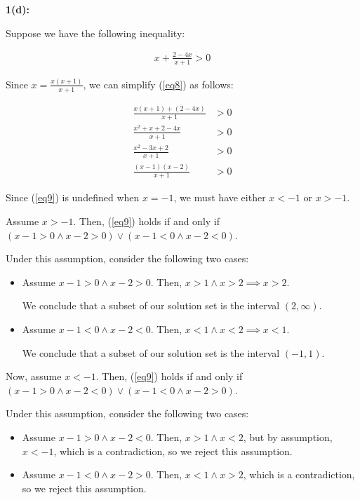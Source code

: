 \documentclass{article}
\begin{document}
\medskip
\textbf{1(d):}

Suppose we have the following inequality:

\begin{align} \label{eq8}
	x + \frac{2-4x}{x+1} > 0
\end{align}

Since $x = \frac{x(x+1)}{x+1}$,
we can simplify (\ref{eq8}) as follows:

\begin{align}
	\frac{x(x+1) + (2-4x)}{x+1} &> 0 \\
	\frac{x^2 + x + 2-4x}{x+1} &> 0 \\
	\frac{x^2 -3x + 2}{x+1} &> 0 \\
	\label{eq9}
	\frac{(x-1)(x-2)}{x+1} &> 0
\end{align}

Since (\ref{eq9}) is undefined when $x = -1$,
we must have either $x < -1$ or $x > -1$.

Assume $x > -1$.
Then, (\ref{eq9}) holds if and only if
$(x - 1 > 0 \land  x-2 > 0) \lor (x-1 < 0 \land x-2 < 0)$.

Under this assumption, consider the following two cases:

\begin{itemize}
	\item
Assume $x - 1 > 0 \land x - 2 > 0$.
Then, $x > 1 \land x > 2 \implies x > 2$.

We conclude that a subset of our solution set is the interval $(2, \infty)$.

\item
Assume $x - 1 < 0 \land x - 2 < 0$.
Then, $x < 1 \land x < 2 \implies x < 1$.

We conclude that a subset of our solution set is the interval $(-1, 1)$.
\end{itemize}

Now, assume $x < -1$.
Then, (\ref{eq9}) holds if and only if
$(x - 1 > 0 \land  x-2 < 0) \lor (x-1 < 0 \land x-2 > 0)$.

Under this assumption, consider the following two cases:

\begin{itemize}
	\item
	Assume $x - 1 > 0 \land x - 2 < 0$.
	Then, $x > 1 \land x < 2$,
	but by assumption, $x < -1$, which is a contradiction,
	so we reject this assumption.
	\item
	Assume $x - 1 < 0 \land x - 2 > 0$.
	Then, $x < 1 \land x > 2$, which is a contradiction,
	so we reject this assumption.
\end{itemize}
\end{document}
